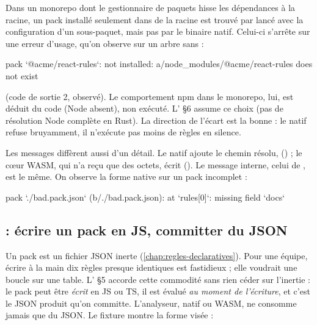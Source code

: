 \begin{piege}
Dans un monorepo dont le gestionnaire de paquets \og hisse\fg{} les dépendances à la racine, un pack installé seulement dans  de la racine est trouvé par  lancé avec la configuration d'un sous-paquet, mais pas par le binaire natif. Celui-ci s'arrête sur une erreur d'usage, qu'on observe sur un arbre sans  :
\begin{sortie}
[error] pack `@acme/react-rules`: not installed: a/node_modules/@acme/react-rules does not exist
\end{sortie}
(code de sortie 2, observé). Le comportement npm dans le monorepo, lui, est déduit du code (Node absent), non exécuté. L' §6 assume ce choix (\og pas de résolution Node complète en Rust\fg{}). La direction de l'écart est la bonne : le natif refuse bruyamment, il n'exécute pas moins de règles en silence.
\end{piege}

Les messages diffèrent aussi d'un détail. Le natif ajoute le chemin résolu,  () ; le cœur WASM, qui n'a reçu que des octets, écrit  (). Le message interne, celui de , est le même. On observe la forme native sur un pack incomplet :
\begin{sortie}
[error] pack `./bad.pack.json` (b/./bad.pack.json): at `rules[0]`: missing field `docs`
\end{sortie}

\subsection{ : écrire un pack en JS, committer du JSON}
\label{sec:distribution-npm-packs}

Un pack est un fichier JSON inerte (\cref{chap:regles-declaratives}). Pour une équipe, écrire à la main dix règles presque identiques est fastidieux ; elle voudrait une boucle sur une table. L' §5 accorde cette commodité sans rien céder sur l'inertie : le pack peut être \emph{écrit} en JS ou TS, il est évalué \emph{au moment de l'écriture}, et c'est le JSON produit qu'on committe. L'analyseur, natif ou WASM, ne consomme jamais que du JSON. Le fixture  montre la forme visée :


